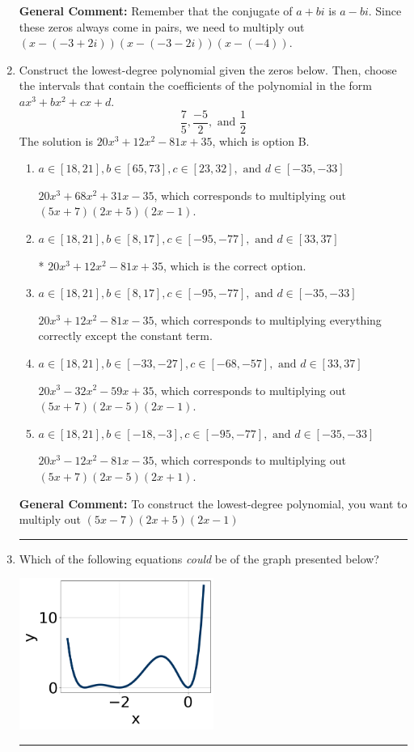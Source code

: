 \documentclass{extbook}[14pt]
\newcommand{\litem}[1]{\item #1

\rule{\textwidth}{0.4pt}}
\begin{document}
\begin{enumerate}
{\textbf{General Comment:} Remember that the conjugate of $a+bi$ is $a-bi$. Since these zeros always come in pairs, we need to multiply out $(x-(-3 + 2 i))(x-(-3 - 2 i))(x-(-4))$.
}
\litem{
Construct the lowest-degree polynomial given the zeros below. Then, choose the intervals that contain the coefficients of the polynomial in the form $ax^3+bx^2+cx+d$.
\[ \frac{7}{5}, \frac{-5}{2}, \text{ and } \frac{1}{2} \]The solution is \( 20x^{3} +12 x^{2} -81 x + 35 \), which is option B.\begin{enumerate}[label=\Alph*.]
\item \( a \in [18, 21], b \in [65, 73], c \in [23, 32], \text{ and } d \in [-35, -33] \)

$20x^{3} +68 x^{2} +31 x -35$, which corresponds to multiplying out $(5x + 7)(2x + 5)(2x -1)$.
\item \( a \in [18, 21], b \in [8, 17], c \in [-95, -77], \text{ and } d \in [33, 37] \)

* $20x^{3} +12 x^{2} -81 x + 35$, which is the correct option.
\item \( a \in [18, 21], b \in [8, 17], c \in [-95, -77], \text{ and } d \in [-35, -33] \)

$20x^{3} +12 x^{2} -81 x -35$, which corresponds to multiplying everything correctly except the constant term.
\item \( a \in [18, 21], b \in [-33, -27], c \in [-68, -57], \text{ and } d \in [33, 37] \)

$20x^{3} -32 x^{2} -59 x + 35$, which corresponds to multiplying out $(5x + 7)(2x -5)(2x -1)$.
\item \( a \in [18, 21], b \in [-18, -3], c \in [-95, -77], \text{ and } d \in [-35, -33] \)

$20x^{3} -12 x^{2} -81 x -35$, which corresponds to multiplying out $(5x + 7)(2x -5)(2x + 1)$.
\end{enumerate}

\textbf{General Comment:} To construct the lowest-degree polynomial, you want to multiply out $(5x -7)(2x + 5)(2x -1)$
}
\litem{
Which of the following equations \textit{could} be of the graph presented below?

\begin{center}
    \includegraphics[width=0.5\textwidth]{../Figures/polyGraphToFunctionB.png}
\end{center}


}
\end{enumerate}
\end{document}
